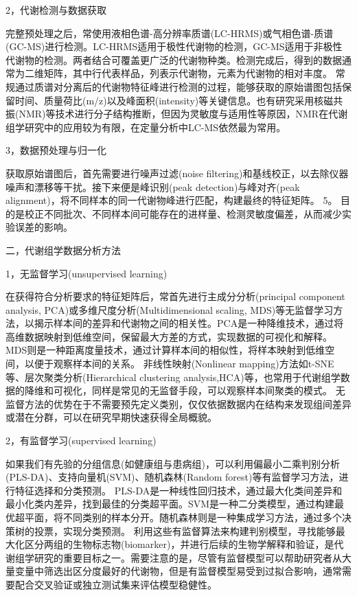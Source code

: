 \documentclass[12pt,hyperref,a4paper,UTF8]{ctexart}
\begin{document}
2，代谢检测与数据获取

完整预处理之后，常使用液相色谱-高分辨率质谱(LC-HRMS)或气相色谱-质谱(GC-MS)进行检测。LC-HRMS适用于极性代谢物的检测，GC-MS适用于非极性代谢物的检测。两者结合可覆盖更广泛的代谢物种类。检测完成后，得到的数据通常为二维矩阵，其中行代表样品，列表示代谢物，元素为代谢物的相对丰度。
常规通过质谱对分离后的代谢物特征峰进行检测的过程，能够获取的原始谱图包括保留时间、质量荷比(m/z)以及峰面积(intensity)等关键信息。也有研究采用核磁共振(NMR)等技术进行分子结构推断，但因为灵敏度与适用性等原因，NMR在代谢组学研究中的应用较为有限，在定量分析中LC-MS依然最为常用\cite{4}。

3，数据预处理与归一化

获取原始谱图后，首先需要进行噪声过滤(noise filtering)和基线校正，以去除仪器噪声和漂移等干扰。接下来便是峰识别(peak detection)与峰对齐(peak alignment)，将不同样本的同一代谢物峰进行匹配，构建最终的特征矩阵。
{5}。
目的是校正不同批次、不同样本间可能存在的进样量、检测灵敏度偏差，从而减少实验误差的影响。

二，代谢组学数据分析方法

1，无监督学习(unsupervised learning)

在获得符合分析要求的特征矩阵后，常首先进行主成分分析(principal component analysis, PCA)或多维尺度分析(Multidimensional scaling, MDS)等无监督学习方法，以揭示样本间的差异和代谢物之间的相关性。PCA是一种降维技术，通过将高维数据映射到低维空间，保留最大方差的方式，实现数据的可视化和解释。MDS则是一种距离度量技术，通过计算样本间的相似性，将样本映射到低维空间，以便于观察样本间的关系。
非线性映射(Nonlinear mapping)方法如t-SNE等、层次聚类分析(Hierarchical clustering analysis,HCA)等，也常用于代谢组学数据的降维和可视化，同样是常见的无监督手段，可以观察样本间聚类的模式。
无监督方法的优势在于不需要预先定义类别，仅仅依据数据内在结构来发现组间差异或潜在分群，可以在研究早期快速获得全局概貌\cite{6}。

2，有监督学习(supervised learning)

如果我们有先验的分组信息(如健康组与患病组)，可以利用偏最小二乘判别分析(PLS-DA)、支持向量机(SVM)、随机森林(Random forest)等有监督学习方法，进行特征选择和分类预测。
PLS-DA是一种线性回归技术，通过最大化类间差异和最小化类内差异，找到最佳的分类超平面。SVM是一种二分类模型，通过构建最优超平面，将不同类别的样本分开。随机森林则是一种集成学习方法，通过多个决策树的投票，实现分类预测。
利用这些有监督算法来构建判别模型，寻找能够最大化区分两组的生物标志物(biomarker)，并进行后续的生物学解释和验证，是代谢组学研究的重要目标之一。需要注意的是，尽管有监督模型可以帮助研究者从大量变量中筛选出区分度最好的代谢物，但是有监督模型易受到过拟合影响，通常需要配合交叉验证或独立测试集来评估模型稳健性\cite{7}。
\end{document}
